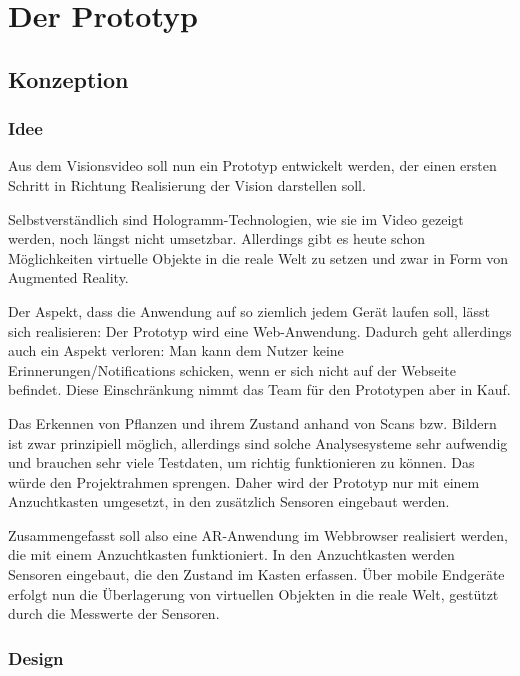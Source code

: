 \hypertarget{prototyp}{%
\section{Der Prototyp}\label{prototyp}}

\hypertarget{konzeption}{%
\subsection{Konzeption}\label{konzeption}}

\hypertarget{idee}{%
\subsubsection{Idee}\label{idee}}

Aus dem Visionsvideo soll nun ein Prototyp entwickelt werden, der einen
ersten Schritt in Richtung Realisierung der Vision darstellen soll.

Selbstverständlich sind Hologramm-Technologien, wie sie im Video gezeigt
werden, noch längst nicht umsetzbar. Allerdings gibt es heute schon
Möglichkeiten virtuelle Objekte in die reale Welt zu setzen und zwar in
Form von Augmented Reality.

Der Aspekt, dass die Anwendung auf so ziemlich jedem Gerät laufen soll,
lässt sich realisieren: Der Prototyp wird eine Web-Anwendung. Dadurch
geht allerdings auch ein Aspekt verloren: Man kann dem Nutzer keine
Erinnerungen/Notifications schicken, wenn er sich nicht auf der Webseite
befindet. Diese Einschränkung nimmt das Team für den Prototypen aber in
Kauf.

Das Erkennen von Pflanzen und ihrem Zustand anhand von Scans bzw.
Bildern ist zwar prinzipiell möglich, allerdings sind solche
Analysesysteme sehr aufwendig und brauchen sehr viele Testdaten, um
richtig funktionieren zu können. Das würde den Projektrahmen sprengen.
Daher wird der Prototyp nur mit einem Anzuchtkasten umgesetzt, in den
zusätzlich Sensoren eingebaut werden.

Zusammengefasst soll also eine AR-Anwendung im Webbrowser realisiert
werden, die mit einem Anzuchtkasten funktioniert. In den Anzuchtkasten
werden Sensoren eingebaut, die den Zustand im Kasten erfassen. Über
mobile Endgeräte erfolgt nun die Überlagerung von virtuellen Objekten in
die reale Welt, gestützt durch die Messwerte der Sensoren.

\hypertarget{design}{%
\subsubsection{Design}\label{design}}

